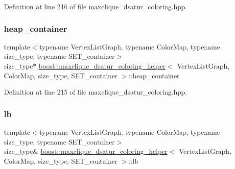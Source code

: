 Definition at line 216 of file maxclique\+\_\+dsatur\+\_\+coloring.\+hpp.

\mbox{\label{classboost_1_1maxclique__dsatur__coloring__helper_a8af7ffed5555add33c712f2da0b9320d}} 
\subsubsection{\texorpdfstring{heap\+\_\+container}{heap\_container}}
{\footnotesize\ttfamily template$<$typename Vertex\+List\+Graph, typename Color\+Map, typename size\+\_\+type, typename S\+E\+T\+\_\+container$>$ \\
size\+\_\+type$\ast$ \hyperlink{classboost_1_1maxclique__dsatur__coloring__helper}{boost\+::maxclique\+\_\+dsatur\+\_\+coloring\+\_\+helper}$<$ Vertex\+List\+Graph, Color\+Map, size\+\_\+type, S\+E\+T\+\_\+container $>$\+::heap\+\_\+container\hspace{0.3cm}{\ttfamily [private]}}



Definition at line 215 of file maxclique\+\_\+dsatur\+\_\+coloring.\+hpp.

\mbox{\label{classboost_1_1maxclique__dsatur__coloring__helper_a768edb034872c46d8f1b26ed21f82f22}} 
\subsubsection{\texorpdfstring{lb}{lb}}
{\footnotesize\ttfamily template$<$typename Vertex\+List\+Graph, typename Color\+Map, typename size\+\_\+type, typename S\+E\+T\+\_\+container$>$ \\
size\+\_\+type\& \hyperlink{classboost_1_1maxclique__dsatur__coloring__helper}{boost\+::maxclique\+\_\+dsatur\+\_\+coloring\+\_\+helper}$<$ Vertex\+List\+Graph, Color\+Map, size\+\_\+type, S\+E\+T\+\_\+container $>$\+::lb\hspace{0.3cm}{\ttfamily [private]}}



